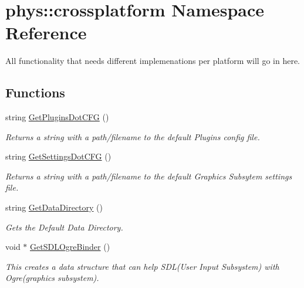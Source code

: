 \hypertarget{namespacephys_1_1crossplatform}{
\section{phys::crossplatform Namespace Reference}
\label{d4/d59/namespacephys_1_1crossplatform}
}


All functionality that needs different implemenations per platform will go in here.  


\subsection*{Functions}
\begin{DoxyCompactItemize}
\item 
string \hyperlink{namespacephys_1_1crossplatform_a8f7321f409f1f2a5fa07881ae22fcc2d}{GetPluginsDotCFG} ()
\begin{DoxyCompactList}\small\item\em Returns a string with a path/filename to the default Plugins config file. \item\end{DoxyCompactList}\item 
string \hyperlink{namespacephys_1_1crossplatform_a2d43f3aa5a485564c3f375b36a08152f}{GetSettingsDotCFG} ()
\begin{DoxyCompactList}\small\item\em Returns a string with a path/filename to the default Graphics Subsytem settings file. \item\end{DoxyCompactList}\item 
string \hyperlink{namespacephys_1_1crossplatform_ae7b1d4b6dac634392c6224f26ab85001}{GetDataDirectory} ()
\begin{DoxyCompactList}\small\item\em Gets the Default Data Directory. \item\end{DoxyCompactList}\item 
void $\ast$ \hyperlink{namespacephys_1_1crossplatform_a596ed780d507e681d9261d26b64a8ed9}{GetSDLOgreBinder} ()
\begin{DoxyCompactList}\small\item\em This creates a data structure that can help SDL(User Input Subsystem) with Ogre(graphics subsystem). \item\end{DoxyCompactList}\item 

\end{DoxyCompactItemize}
